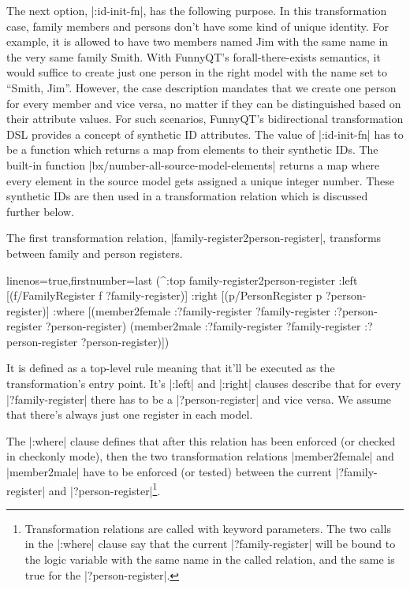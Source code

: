 \documentclass[a4paper]{article}
\newcommand{\code}{\clojureinline}
\begin{document}
The next option, \code|:id-init-fn|, has the following purpose.  In this
transformation case, family members and persons don't have some kind of unique
identity.  For example, it is allowed to have two members named Jim with the
same name in the very same family Smith.  With FunnyQT's forall-there-exists
semantics, it would suffice to create just one person in the right model with
the name set to ``Smith, Jim''.  However, the case description mandates that we
create one person for every member and vice versa, no matter if they can be
distinguished based on their attribute values.  For such scenarios, FunnyQT's
bidirectional transformation DSL provides a concept of synthetic ID attributes.
The value of \code|:id-init-fn| has to be a function which returns a map from
elements to their synthetic IDs.  The built-in function
\code|bx/number-all-source-model-elements| returns a map where every element in
the source model gets assigned a unique integer number.  These synthetic IDs
are then used in a transformation relation which is discussed further below.

The first transformation relation, \code|family-register2person-register|,
transforms between family and person registers.

\begin{clojurecode*}{linenos=true,firstnumber=last}
  (^:top family-register2person-register
   :left  [(f/FamilyRegister f ?family-register)]
   :right [(p/PersonRegister p ?person-register)]
   :where [(member2female :?family-register ?family-register :?person-register ?person-register)
           (member2male :?family-register ?family-register :?person-register ?person-register)])
\end{clojurecode*}

It is defined as a top-level rule meaning that it'll be executed as the
transformation's entry point.  It's \code|:left| and \code|:right| clauses
describe that for every \code|?family-register| there has to be a
\code|?person-register| and vice versa.  We assume that there's always just one
register in each model.

The \code|:where| clause defines that after this relation has been enforced (or
checked in checkonly mode), then the two transformation relations
\code|member2female| and \code|member2male| have to be enforced (or tested)
between the current \code|?family-register| and
\code|?person-register|\footnote{Transformation relations are called with
  keyword parameters.  The two calls in the \code|:where| clause say that the
  current \code|?family-register| will be bound to the logic variable with the
  same name in the called relation, and the same is true for the
  \code|?person-register|.}.
\end{document}
